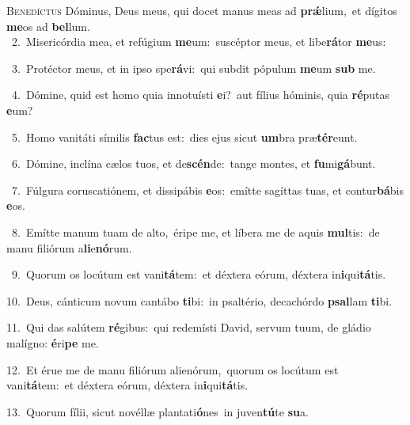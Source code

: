 \lettrine{\initial\textcolor{\initialcolor}{B}}{enedíctus} Dóminus, Deus meus, qui docet manus meas ad \textbf{prǽ}\-lium,~\star et dígitos \textbf{me}\-os ad \textbf{bel}\-lum.\\
{\numbfont\textcolor{\numbcolor}{~2.}}~Misericórdia mea, et refúgium \textbf{me}\-um:~\star suscéptor meus, et libe\-\textbf{rá}\-tor \textbf{me}\-us:\par
{\numbfont\textcolor{\numbcolor}{~3.}}~Protéctor meus, et in ipso spe\-\textbf{rá}\-vi:~\star qui subdit pópulum \textbf{me}\-um \textbf{sub} me.\par
{\numbfont\textcolor{\numbcolor}{~4.}}~Dómine, quid est homo quia innotuísti \textbf{e}\-i?~\star aut fílius hóminis, quia \textbf{ré}\-putas \textbf{e}\-um?\par
{\numbfont\textcolor{\numbcolor}{~5.}}~Homo vanitáti símilis \textbf{fac}\-tus est:~\star dies ejus sicut \textbf{um}\-bra præ\-\textbf{tér}\-eunt.\par
{\numbfont\textcolor{\numbcolor}{~6.}}~Dómine, inclína cælos tuos, et de\-\textbf{scén}\-de:~\star tange montes, et \textbf{fu}\-mi\-\textbf{gá}\-bunt.\par
{\numbfont\textcolor{\numbcolor}{~7.}}~Fúlgura coruscatiónem, et dissipábis \textbf{e}\-os:~\star emítte sagíttas tuas, et contur\-\textbf{bá}\-bis \textbf{e}\-os.\par
{\numbfont\textcolor{\numbcolor}{~8.}}~Emítte manum tuam de alto,~\dagger éripe me, et líbera me de aquis \textbf{mul}\-tis:~\star de manu filiórum a\-\textbf{li}\-e\-\textbf{nó}\-rum.\par
{\numbfont\textcolor{\numbcolor}{~9.}}~Quorum os locútum est vani\-\textbf{tá}\-tem:~\star et déxtera eórum, déxtera in\-\textbf{i}\-qui\-\textbf{tá}\-tis.\par
{\numbfont\textcolor{\numbcolor}{10.}}~Deus, cánticum novum cantábo \textbf{ti}\-bi:~\star in psaltério, decachórdo \textbf{psal}\-lam \textbf{ti}\-bi.\par
{\numbfont\textcolor{\numbcolor}{11.}}~Qui das salútem \textbf{ré}\-gibus:~\star qui redemísti David, servum tuum, de gládio malígno: \textbf{é}\-ri\textbf{pe} me.\par
{\numbfont\textcolor{\numbcolor}{12.}}~Et érue me de manu filiórum alienórum,~\dagger quorum os locútum est vani\-\textbf{tá}\-tem:~\star et déxtera eórum, déxtera in\-\textbf{i}\-qui\-\textbf{tá}\-tis.\par
{\numbfont\textcolor{\numbcolor}{13.}}~Quorum fílii, sicut novéllæ plantati\-\textbf{ó}\-nes~\star in juven\-\textbf{tú}\-te \textbf{su}\-a.\par
